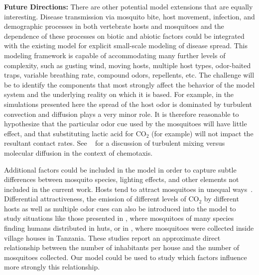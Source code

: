 \documentclass[10pt]{article}
\begin{document}
\textbf{Future Directions:} There are other potential model extensions that are equally interesting. 
Disease transmission via mosquito bite, host movement, infection, and demographic processes in both vertebrate hosts and mosquitoes and the dependence of these processes on biotic and abiotic factors could be integrated with the existing model for explicit small-scale modeling of disease spread. This modeling framework is capable of accommodating many further levels of complexity, such as gusting wind, moving hosts, multiple host types, odor-baited traps, variable breathing rate, compound odors, repellents, etc. The challenge will be to identify the components that most strongly affect the behavior of the model system and the underlying reality on which it is based. For example, in the simulations presented here the spread of the host odor is dominated by turbulent convection and diffusion plays a very minor role. It is therefore reasonable to hypothesize that the particular odor cue used by the mosquitoes will have little effect, and that substituting lactic acid for $\mbox{CO}_2$ (for example) will not impact the resultant contact rates. See ~\cite{Vickers2000} for a discussion of turbulent mixing versus molecular diffusion in the context of chemotaxis.

Additional factors could be included in the model in order to capture subtle differences between mosquito species, lighting effects, and other elements not included in the current work.  Hosts tend to attract mosquitoes in unequal ways~\cite{Knols1995}. Differential attractiveness, the emission of different levels of $\mbox{CO}_2$ by different hosts as well as multiple odor cues can also be introduced into the model to study situations like those presented in \cite{Haddow1942}, where mosquitoes of many species finding humans distributed in huts, or in \cite{KileenEtAl2007A}, where mosquitoes were collected inside village houses in Tanzania. These studies report an approximate direct relationship between the number of inhabitants per house and the number of mosquitoes collected. Our model could be used to study which factors influence more strongly this relationship.
\end{document}
